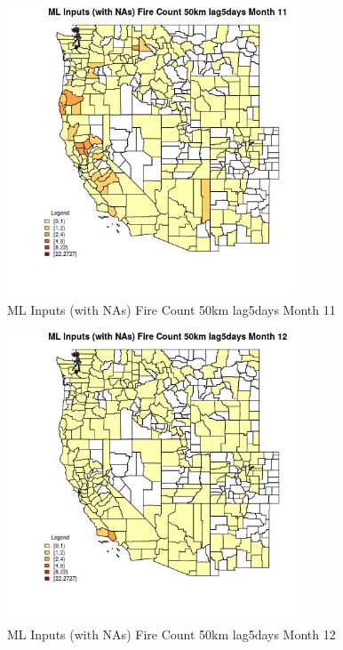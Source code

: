 \begin{figure} 
\centering  
\includegraphics[width=0.77\textwidth]{Code_Outputs/Report_ML_input_PM25_Step4_part_f_de_duplicated_aveswNAs_CountyFire_Count_50km_lag5daysmedianMonth11.jpg} 
\caption{\label{fig:Report_ML_input_PM25_Step4_part_f_de_duplicated_aveswNAsCountyFire_Count_50km_lag5daysmedianMonth11}ML Inputs (with NAs) Fire Count 50km lag5days Month 11} 
\end{figure} 
 

\begin{figure} 
\centering  
\includegraphics[width=0.77\textwidth]{Code_Outputs/Report_ML_input_PM25_Step4_part_f_de_duplicated_aveswNAs_CountyFire_Count_50km_lag5daysmedianMonth12.jpg} 
\caption{\label{fig:Report_ML_input_PM25_Step4_part_f_de_duplicated_aveswNAsCountyFire_Count_50km_lag5daysmedianMonth12}ML Inputs (with NAs) Fire Count 50km lag5days Month 12} 
\end{figure} 
 

